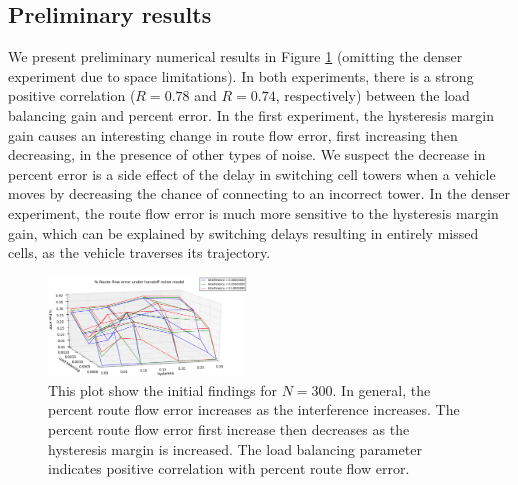 \subsection{Preliminary results}

We present preliminary numerical results in Figure \ref{fig:results1} (omitting the denser experiment due to space limitations). In both experiments, there is a strong positive correlation ($R=0.78$ and $R=0.74$, respectively) between the load balancing gain and percent error. In the first experiment, the hysteresis margin gain causes an interesting change in route flow error, first increasing then decreasing, in the presence of other types of noise. We suspect the decrease in percent error is a side effect of the delay in switching cell towers when a vehicle moves by decreasing the chance of connecting to an incorrect tower. In the denser experiment, the route flow error is much more sensitive to the hysteresis margin gain, which can be explained by switching delays resulting in entirely missed cells, as the vehicle traverses its trajectory.

\begin{figure}[h!]
  \centering
    \includegraphics[width=0.47\textwidth]{figures/results_300_hysteresis.png}
  \caption{\footnotesize{This plot show the initial findings for $N=300$. In general, the percent route flow error increases as the interference increases. The percent route flow error first increase then decreases as the hysteresis margin is increased. The load balancing parameter indicates positive correlation with percent route flow error.}}
  \label{fig:results1}
\end{figure}

